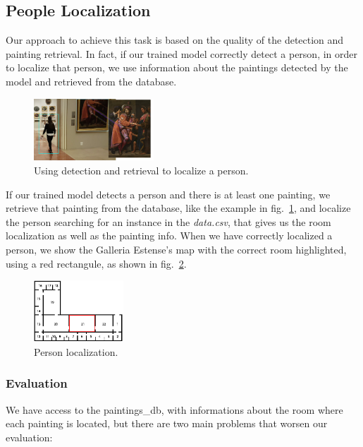 \subsection{People Localization}
Our approach to achieve this task is based on the quality of the detection and painting retrieval. In fact, if our trained model correctly detect a person, in order to localize that person, we use information about the paintings detected by the model and retrieved from the database. 

\begin{figure}[h!]
    \centering
    \includegraphics[width=0.4\textwidth]{pictures/people_localization/localization}
    \caption{Using detection and retrieval to localize a person.}
    \label{fig:localization}
\end{figure}

If our trained model detects a person and there is at least one painting, we retrieve that painting from the database, like the example in fig.~\ref{fig:localization}, and localize the person searching for an instance in the \emph{data.csv}, that gives us the room localization as well as the painting info.
When we have correctly localized a person, we show the Galleria Estense's map with the correct room highlighted, using a red rectangule, as shown in fig.~\ref{fig:localization_result}.

\begin{figure}[h!]
    \centering
    \includegraphics[width=0.3\textwidth]{pictures/people_localization/localization_result}
    \caption{Person localization.}
    \label{fig:localization_result}
\end{figure}



\subsubsection{Evaluation}
We have access to the paintings\_db, with informations about the room where each painting is located, but there are two main problems that worsen our evaluation:

